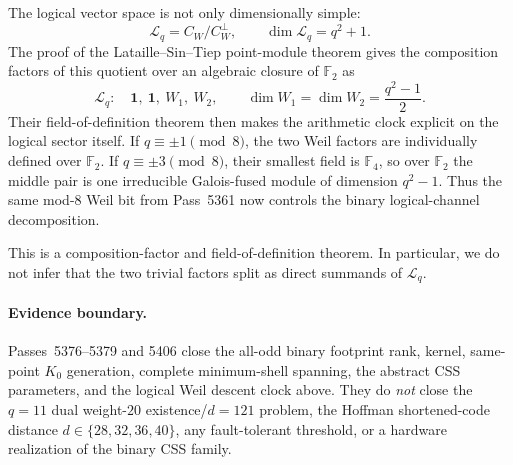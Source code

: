 The logical vector space is not only dimensionally simple:
\[
 \mathcal L_q=C_W/C_W^\perp,
 \qquad
 \dim\mathcal L_q=q^2+1.
\]
The proof of the Lataille--Sin--Tiep point-module theorem gives the composition
factors of this quotient over an algebraic closure of $\mathbb F_2$ as
\[
 \boxed{
 \mathcal L_q:\quad \mathbf1,\ \mathbf1,\ W_1,\ W_2,
 \qquad
 \dim W_1=\dim W_2=\frac{q^2-1}{2}.
 }
\]
Their field-of-definition theorem then makes the arithmetic clock explicit on
the logical sector itself.  If
$q\equiv\pm1\pmod8$, the two Weil factors are individually defined over
$\mathbb F_2$.  If $q\equiv\pm3\pmod8$, their smallest field is
$\mathbb F_4$, so over $\mathbb F_2$ the middle pair is one irreducible
Galois-fused module of dimension $q^2-1$.  Thus the same mod-$8$ Weil bit from
Pass~5361 now controls the binary logical-channel decomposition.

This is a composition-factor and field-of-definition theorem.  In particular,
we do not infer that the two trivial factors split as direct summands of
$\mathcal L_q$.

\paragraph{Evidence boundary.}
Passes~5376--5379 and 5406 close the all-odd binary footprint rank, kernel,
same-point $K_0$ generation, complete minimum-shell spanning, the abstract CSS
parameters, and the logical Weil descent clock above.  They do \emph{not} close
the $q=11$ dual weight-$20$ existence/$d=121$ problem, the Hoffman
shortened-code distance $d\in\{28,32,36,40\}$, any fault-tolerant threshold,
or a hardware realization of the binary CSS family.
